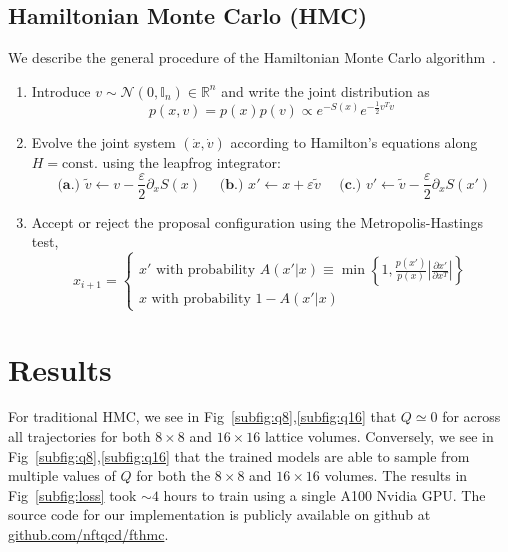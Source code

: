 \documentclass[a4paper,11pt]{article}
\begin{document}
\subsection{\label{subsec:hmc}Hamiltonian Monte Carlo (HMC)}
We describe the general procedure of the Hamiltonian Monte Carlo
algorithm~\cite{Betancourt:2017}.
\begin{enumerate}
    \item Introduce \(v \sim \mathcal{N} (0,\mathbb{I}_{n}) \in \mathbb{R}^{n}\)
        and write the joint distribution as
        \begin{equation}
            p(x, v) = p(x) p(v) \propto e^{-S(x)} e^{-\frac{1}{2} v^{T} v}
        \end{equation}
    \item Evolve the joint system \((\dot x, \dot v)\) according to
        Hamilton's equations along \(H=\text{const.}\) using the leapfrog
        integrator:
        \begin{equation}
            \textbf{ (a.)  } \tilde{v} \leftarrow v - \frac{\varepsilon}{2}\partial_{x}S(x)\quad
            \textbf{ (b.)  } x' \leftarrow x + \varepsilon \tilde{v}\quad
            \textbf{ (c.)  } v' \leftarrow \tilde{v} - \frac{\varepsilon}{2}\partial_{x} S(x')
        \end{equation}
    \item Accept or reject the proposal configuration using the
        Metropolis-Hastings test,
        \begin{equation}
            x_{i+1} = \begin{cases}
                x' \text{ with probability } 
                    A(x'|x) \equiv \min\left\{1, \frac{p(x')}{p(x)}%
                    \left|\frac{\partial x'}{\partial x^{T}}\right|\right\}\\
                x \text{ with probability } 1 - A(x'|x)
            \end{cases}
        \end{equation}
\end{enumerate}


\section{\label{sec:results}Results}
%
For traditional HMC, we see in Fig~\ref{subfig:q8},\ref{subfig:q16}
that \(Q \simeq 0\) for across all trajectories for both \(8\times 8\) and
\(16\times 16\) lattice volumes.
%
Conversely, we see in Fig~\ref{subfig:q8},\ref{subfig:q16} that the trained
models are able to sample from multiple values of \(Q\) for both the \(8\times
8\) and \(16\times16\) volumes.
%
The results in Fig~\ref{subfig:loss} took \(\sim 4\) hours to train using a
single A100 Nvidia GPU.
%
The source code for our implementation is publicly available on github at
\href{https://www.github.com/nftqcd/fthmc}{github.com/nftqcd/fthmc}.
\end{document}
